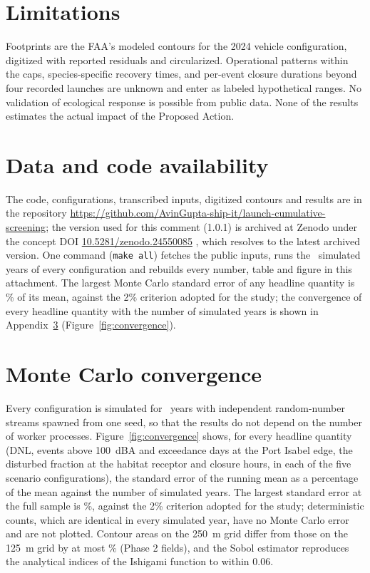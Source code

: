 \documentclass[11pt]{article}
\begin{document}
\section{Limitations}

Footprints are the FAA's modeled contours for the 2024 vehicle configuration, digitized with reported residuals and circularized. Operational patterns within the caps, species-specific recovery times, and per-event closure durations beyond four recorded launches are unknown and enter as labeled hypothetical ranges. No validation of ecological response is possible from public data. None of the results estimates the actual impact of the Proposed Action.

\section{Data and code availability}
\label{sec:data}

The code, configurations, transcribed inputs, digitized contours and results are in the repository \url{https://github.com/AvinGupta-ship-it/launch-cumulative-screening}; the version used for this comment (1.0.1) is archived at Zenodo under the concept DOI \href{https://doi.org/10.5281/zenodo.24550085}{10.5281/zenodo.24550085} \citep{gupta2026code}, which resolves to the latest archived version. One command (\texttt{make all}) fetches the public inputs, runs the \valMcNRealizations~simulated years of every configuration and rebuilds every number, table and figure in this attachment. The largest Monte Carlo standard error of any headline quantity is \valMcMaxSeFractionPct\% of its mean, against the 2\% criterion adopted for the study; the convergence of every headline quantity with the number of simulated years is shown in Appendix~\ref{app:convergence} (Figure~\ref{fig:convergence}).

\FloatBarrier
\appendix
\section{Monte Carlo convergence}
\label{app:convergence}

Every configuration is simulated for \valMcNRealizations~years with independent random-number streams spawned from one seed, so that the results do not depend on the number of worker processes. Figure~\ref{fig:convergence} shows, for every headline quantity (DNL, events above 100~dBA and exceedance days at the Port Isabel edge, the disturbed fraction at the habitat receptor and closure hours, in each of the five scenario configurations), the standard error of the running mean as a percentage of the mean against the number of simulated years. The largest standard error at the full sample is \valMcMaxSeFractionPct\%, against the 2\% criterion adopted for the study; deterministic counts, which are identical in every simulated year, have no Monte Carlo error and are not plotted. Contour areas on the 250~m grid differ from those on the 125~m grid by at most \valConvPhaseTwoMaxRelPct\% (Phase 2 fields), and the Sobol estimator reproduces the analytical indices of the Ishigami function to within 0.06.
\end{document}
